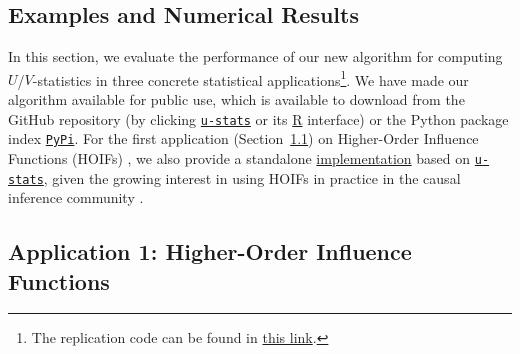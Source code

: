 \documentclass[12pt]{article}
\newcommand{\libref}[2]{\href{#2}{\texttt{#1}}}
\def\package{\libref{u-stats}{https://github.com/zrq1706/U-Statistics-Python}}
\theoremstyle{plain}
\theoremstyle{definition}
\def\Einsum{\textsc{Einsum}}
\def\package{\libref{u-stats}{https://github.com/zrq1706/U-Statistics-Python}}
\newcommand{\opteinsum}{\libref{opt-einsum}{https://dgasmith.github.io/opt_einsum/}}
\begin{document}
\begin{bibunit}[agsm]
\section{Examples and Numerical Results}  
\label{sec:examples}

In this section, we evaluate the performance of our new algorithm for computing $U$/$V$-statistics in three concrete statistical applications\footnote{The replication code can be found in \href{https://github.com/cxy0714/U-Statistics-Experiments}{this link}.}. %
We have made our algorithm available for public use, which is available to download from the GitHub repository (by clicking \package{} or its \href{https://github.com/cxy0714/U-Statistics-R}{R} interface) or the Python package index \href{https://pypi.org/}{\texttt{PyPi}}.  For the first application (Section~\ref{sec:example_hoif}) on Higher-Order Influence Functions (HOIFs) \citep{robins2008higher}, we also provide a standalone \href{https://github.com/cxy0714/HOIF}{implementation} based on \package{}, given the growing interest in using HOIFs in practice in the causal inference community \citep{wager2024causal, zheng2025perturbed, cinelli2025challenges}.


\subsection{Application 1: Higher-Order Influence Functions}  
\label{sec:example_hoif}


\end{bibunit}
\end{document}

